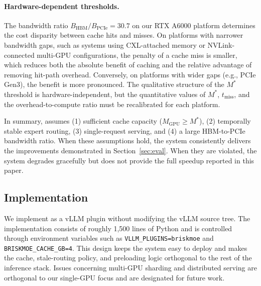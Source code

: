 \paragraph{Hardware-dependent thresholds.}
The bandwidth ratio $B_{\mathrm{HBM}} / B_{\mathrm{PCIe}} = 30.7$ on our RTX A6000 platform determines the cost disparity between cache hits and misses. On platforms with narrower bandwidth gaps, such as systems using CXL-attached memory or NVLink-connected multi-GPU configurations, the penalty of a cache miss is smaller, which reduces both the absolute benefit of caching and the relative advantage of removing hit-path overhead. Conversely, on platforms with wider gaps (e.g., PCIe Gen3), the benefit is more pronounced. The qualitative structure of the $M^*$ threshold is hardware-independent, but the quantitative values of $M^*$, $t_{\mathrm{miss}}$, and the overhead-to-compute ratio must be recalibrated for each platform.

In summary, \sysname assumes (1) sufficient cache capacity ($M_{\mathrm{GPU}} \ge M^*$), (2) temporally stable expert routing, (3) single-request serving, and (4) a large HBM-to-PCIe bandwidth ratio. When these assumptions hold, the system consistently delivers the improvements demonstrated in Section~\ref{sec:eval}. When they are violated, the system degrades gracefully but does not provide the full speedup reported in this paper.

\subsection{Implementation}

We implement \sysname as a vLLM plugin without modifying the vLLM source tree. The implementation consists of roughly 1{,}500 lines of Python and is controlled through environment variables such as \texttt{VLLM\_PLUGINS=briskmoe} and \texttt{BRISKMOE\_CACHE\_GB=4}. This design keeps the system easy to deploy and makes the cache, stale-routing policy, and preloading logic orthogonal to the rest of the inference stack. Issues concerning multi-GPU sharding and distributed serving are orthogonal to our single-GPU focus and are designated for future work.

